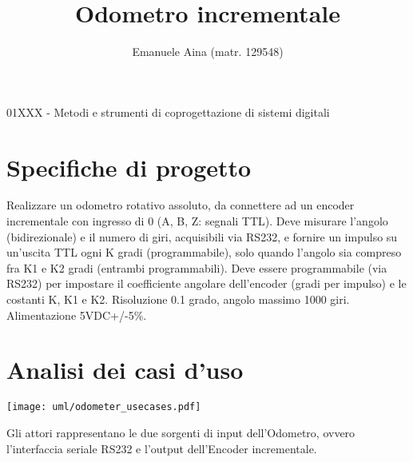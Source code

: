 \documentclass [11pt,a4paper,oneside]{article}
\title{Odometro incrementale}
\author{Emanuele Aina (matr. 129548)}
\date{}
\begin{document}
\maketitle

\begin{center}
\small{01XXX - Metodi e strumenti di coprogettazione di sistemi digitali }
\end{center}

\section{Specifiche di progetto}
Realizzare un odometro rotativo assoluto, da connettere ad un encoder
incrementale con ingresso di 0 (A, B, Z: segnali TTL). Deve misurare l'angolo
(bidirezionale) e il numero di giri, acquisibili via RS232, e fornire un
impulso su un'uscita TTL ogni K gradi (programmabile), solo quando l'angolo
sia compreso fra K1 e K2 gradi (entrambi programmabili). Deve essere
programmabile (via RS232) per impostare il coefficiente angolare dell'encoder
(gradi per impulso) e le costanti K, K1 e K2. Risoluzione 0.1 grado, angolo
massimo 1000 giri. Alimentazione 5VDC+/-5\%.

\section{Analisi dei casi d'uso}
\begin{center}
    \texttt{[image: uml/odometer\_usecases.pdf]}
    \label{usecases}
\end{center}

Gli attori rappresentano le due sorgenti di input dell'Odometro,
ovvero l'interfaccia seriale RS232 e l'output dell'Encoder incrementale.
\end{document}
